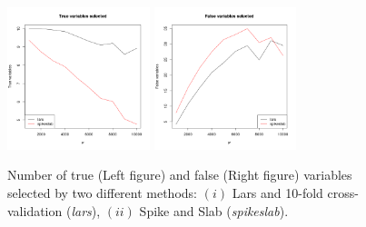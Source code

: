 \documentclass[a4paper,10pt]{article}
\begin{document}
	\begin{figure}[!h]
		\centering
		\includegraphics[width=0.37\textwidth]{fig/truesel}
		\includegraphics[width=0.37\textwidth]{fig/falsesel}
		\caption{Number of true (Left figure) and false (Right figure) variables selected by two different methods: $(i)$ Lars and 10-fold cross-validation (\textit{lars}), $(ii)$ Spike and Slab (\textit{spikeslab}).}
		\label{fig:truefalse}
	\end{figure}
	
\nocite{*}

\newpage

 	
\end{document}
